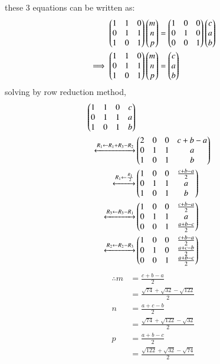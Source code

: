 \documentclass[journal,12pt,twocolumn]{IEEEtran}
\theoremstyle{remark}
\begin{document}
these 3 equations can be written as:
\begin{align}
    \begin{pmatrix}1&1&0\\0&1&1\\1&0&1\\\end{pmatrix}\begin{pmatrix}m\\n\\p\end{pmatrix} &= \begin{pmatrix}1&0&0\\0&1&0\\0&0&1\end{pmatrix}\begin{pmatrix}c\\a\\b\end{pmatrix}\\
    \implies\begin{pmatrix}1&1&0\\0&1&1\\1&0&1\\\end{pmatrix}\begin{pmatrix}m\\n\\p\end{pmatrix} &= \begin{pmatrix}c\\a\\b\end{pmatrix}
\end{align}
solving by row reduction method,
\begin{align}
    \begin{pmatrix}1&1&0&c\\0&1&1&a\\1&0&1&b\end{pmatrix}\\
    \xleftrightarrow[]{R_1 \leftarrow R_1+R_3-R_2}&
    \begin{pmatrix}2&0&0&c+b-a\\0&1&1&a\\1&0&1&b\end{pmatrix}\\
    \xleftrightarrow[]{R_1 \leftarrow \frac{R_1}{2}}&
    \begin{pmatrix}1&0&0&\frac{c+b-a}{2}\\0&1&1&a\\1&0&1&b\end{pmatrix}\\
    \xleftrightarrow[]{R_3 \leftarrow R_3-R_1}&
    \begin{pmatrix}1&0&0&\frac{c+b-a}{2}\\0&1&1&a\\0&0&1&\frac{a+b-c}{2}\end{pmatrix}\\
    \xleftrightarrow[]{R_2 \leftarrow R_2-R_3}&
    \begin{pmatrix}1&0&0&\frac{c+b-a}{2}\\0&1&0&\frac{a+c-b}{2}\\0&0&1&\frac{a+b-c}{2}\end{pmatrix}
\end{align}
\begin{align}
    \therefore
    m&=\frac{c+b-a}{2}\\ 
    &=\frac{\sqrt{74}+\sqrt{32}-\sqrt{122}}{2}\\
    n&=\frac{a+c-b}{2}\\ 
    &=\frac{\sqrt{74}+\sqrt{122}-\sqrt{32}}{2}\\
    p&=\frac{a+b-c}{2}\\
    &=\frac{\sqrt{122}+\sqrt{32}-\sqrt{74}}{2}
\end{align}
\end{document}
